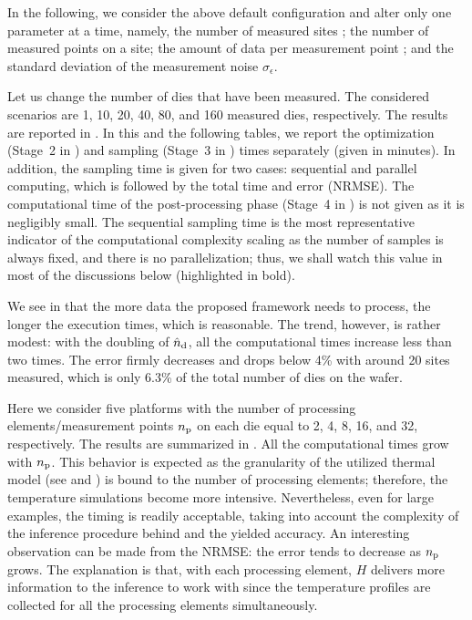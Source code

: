 In the following, we consider the above default configuration and alter only one
parameter at a time, namely, the number of measured sites \ndm; the number of
measured points \np on a site; the amount of data per measurement point \ns; and
the standard deviation of the measurement noise $\sigma_\epsilon$.


Let us change the number of dies \ndm that have been measured. The considered
scenarios are 1, 10, 20, 40, 80, and 160 measured dies, respectively. The
results are reported in . In this and the following
tables, we report the optimization (Stage~2 in ) and sampling
(Stage~3 in ) times separately (given in minutes). In addition,
the sampling time is given for two cases: sequential and parallel computing,
which is followed by the total time and error (NRMSE). The computational time of
the post-processing phase (Stage~4 in ) is not given as it is
negligibly small. The sequential sampling time is the most representative
indicator of the computational complexity scaling as the number of samples is
always fixed, and there is no parallelization; thus, we shall watch this value
in most of the discussions below (highlighted in bold).

We see in  that the more data the proposed framework
needs to process, the longer the execution times, which is reasonable. The
trend, however, is rather modest: with the doubling of ${\hat{n}_\mathrm{d}}$, all the
computational times increase less than two times. The error firmly decreases and
drops below 4\% with around 20 sites measured, which is only 6.3\% of the total
number of dies on the wafer.


Here we consider five platforms with the number of processing
elements/measurement points ${n_\mathrm{p}}$ on each die equal to 2, 4, 8, 16, and 32,
respectively. The results are summarized in . All the
computational times grow with ${n_\mathrm{p}}$. This behavior is expected as the
granularity of the utilized thermal model (see  and
\cite{ukhov2012}) is bound to the number of processing elements; therefore, the
temperature simulations become more intensive. Nevertheless, even for large
examples, the timing is readily acceptable, taking into account the complexity
of the inference procedure behind and the yielded accuracy. An interesting
observation can be made from the NRMSE: the error tends to decrease as ${n_\mathrm{p}}$
grows. The explanation is that, with each processing element, $H$ delivers
more information to the inference to work with since the temperature profiles
are collected for all the processing elements simultaneously.


